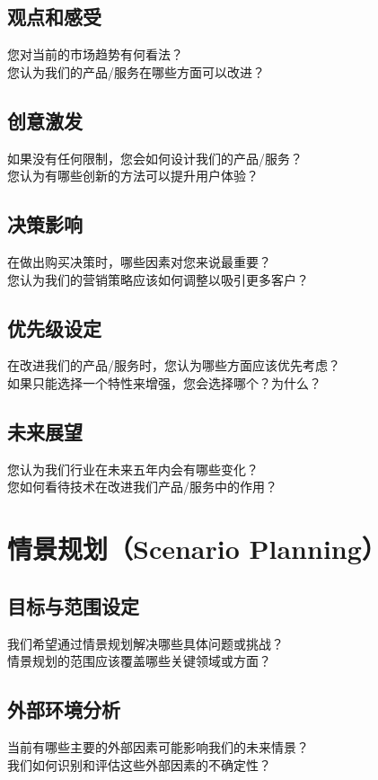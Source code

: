 \documentclass[12pt]{book}
\begin{document}
\subsection{观点和感受}
您对当前的市场趋势有何看法？\\
您认为我们的产品/服务在哪些方面可以改进？\\

\subsection{创意激发}
如果没有任何限制，您会如何设计我们的产品/服务？\\
您认为有哪些创新的方法可以提升用户体验？\\

\subsection{决策影响}
在做出购买决策时，哪些因素对您来说最重要？\\
您认为我们的营销策略应该如何调整以吸引更多客户？\\

\subsection{优先级设定}
在改进我们的产品/服务时，您认为哪些方面应该优先考虑？\\
如果只能选择一个特性来增强，您会选择哪个？为什么？\\

\subsection{未来展望}
您认为我们行业在未来五年内会有哪些变化？\\
您如何看待技术在改进我们产品/服务中的作用？\\

\section{情景规划（Scenario Planning）}
\subsection{目标与范围设定}
我们希望通过情景规划解决哪些具体问题或挑战？\\
情景规划的范围应该覆盖哪些关键领域或方面？\\

\subsection{外部环境分析}
当前有哪些主要的外部因素可能影响我们的未来情景？\\
我们如何识别和评估这些外部因素的不确定性？\\
\end{document}
